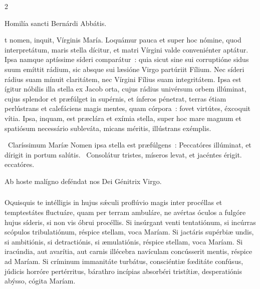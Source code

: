 \documentclass[9pt,twoside]{extarticle}
\begin{document}
\begin{multicols}{2}
{{\begin{center}Homilía sancti Bernárdi Abbátis.\\
\end{center}
t nomen, inquit, Vírginis María. Loquámur pauca et super hoc nómine, quod interpretátum, maris stella dícitur, et matri Vírgini valde conveniénter aptátur. Ipsa namque aptíssime síderi comparátur~: quia sicut sine sui corruptióne sidus suum emíttit rádium, sic absque sui læsióne Virgo partúriit Fílium. Nec síderi rádius suam mínuit claritátem, nec Vírgini Fílius suam integritátem. Ipsa est ígitur nóbilis illa stella ex Jacob orta, cujus rádius univérsum orbem illúminat, cujus splendor et præfúlget in supérnis, et ínferos pénetrat, terras étiam perlústrans et calefáciens magis mentes, quam córpora~: fovet virtútes, éxcoquit vítia. Ipsa, inquam, est præclára et exímia stella, super hoc mare magnum et spatiósum necessário subleváta, micans méritis, illústrans exémplis.

\begin{tightlist}{}
\item {}~Claríssimum Maríæ Nomen ipsa stella est præfúlgens~: \textred{*} Peccatóres illúminat, et dírigit in portum salútis. ~Consolátur tristes, míseros levat, et jacéntes érigit. eccatóres.
\item {\small {} Ab hoste malígno deféndat nos Dei Génitrix Virgo.}
\end{tightlist}

\subsubsection*{\center {}}
\lettrine{O} quisquis te intélligis in hujus sǽculi proflúvio magis inter procéllas et temptestátes fluctuáre, quam per terram ambuláre, ne avértas óculos a fulgóre hujus síderis, si non vis óbrui procéllis. Si insúrgant venti tentatiónum, si incúrras scópulos tribulatiónum, réspice stellam, voca Maríam. Si jactáris supérbiæ undis, si ambitiónis, si detractiónis, si æmulatiónis, réspice stellam, voca Maríam. Si iracúndia, aut avarítia, aut carnis illécebra navículam concússerit mentis, réspice ad Maríam. Si críminum immanitáte turbátus, consciéntiæ fœditáte confúsus, júdicis horróre pertérritus, bárathro incípias absorbéri tristítiæ, desperatiónis abýsso, cógita Maríam.

}}
\end{multicols}
\end{document}
